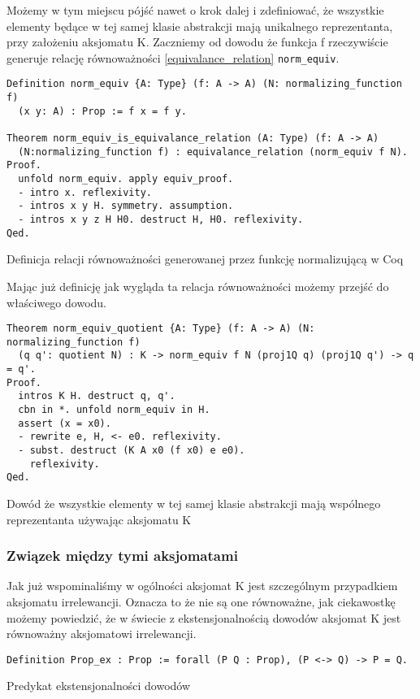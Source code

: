 Możemy w tym miejscu pójść nawet o krok dalej i zdefiniować, że wszystkie elementy będące w tej samej klasie abstrakcji mają unikalnego reprezentanta, przy założeniu aksjomatu K. Zaczniemy od dowodu że funkcja f rzeczywiście generuje relację równoważności \ref{equivalance_relation} \texttt{norm_equiv}.
\begin{code}
\begin{verbatim}
Definition norm_equiv {A: Type} (f: A -> A) (N: normalizing_function f)
  (x y: A) : Prop := f x = f y.

Theorem norm_equiv_is_equivalance_relation (A: Type) (f: A -> A)
  (N:normalizing_function f) : equivalance_relation (norm_equiv f N).
Proof.
  unfold norm_equiv. apply equiv_proof.
  - intro x. reflexivity.
  - intros x y H. symmetry. assumption.
  - intros x y z H H0. destruct H, H0. reflexivity.
Qed. 
\end{verbatim}
\caption{Definicja relacji równoważności generowanej przez funkcję normalizującą w Coq}
\label{norm_equiv}
\end{code}
Mając już definicję jak wygląda ta relacja równoważności możemy przejść do właściwego dowodu.
\begin{code}
\begin{verbatim}
Theorem norm_equiv_quotient {A: Type} (f: A -> A) (N: normalizing_function f) 
  (q q': quotient N) : K -> norm_equiv f N (proj1Q q) (proj1Q q') -> q = q'.
Proof.
  intros K H. destruct q, q'.
  cbn in *. unfold norm_equiv in H. 
  assert (x = x0).
  - rewrite e, H, <- e0. reflexivity.
  - subst. destruct (K A x0 (f x0) e e0).
    reflexivity.
Qed.
\end{verbatim}
\caption{Dowód że wszystkie elementy w tej samej klasie abstrakcji mają wspólnego reprezentanta używając aksjomatu K}
\label{norm_equiv_quotient}
\end{code}
\subsubsection{Związek między tymi aksjomatami}
Jak już wspominaliśmy w ogólności aksjomat K jest szczególnym przypadkiem aksjomatu irrelewancji. Oznacza to że nie są one równoważne, jak ciekawostkę możemy powiedzić, że w świecie z ekstensjonalnością dowodów aksjomat K jest równoważny aksjomatowi irrelewancji.

\begin{code}
\begin{verbatim}
Definition Prop_ex : Prop := forall (P Q : Prop), (P <-> Q) -> P = Q.
\end{verbatim}
\caption{Predykat ekstensjonalności dowodów}
\label{Prop_ex}
\end{code}

